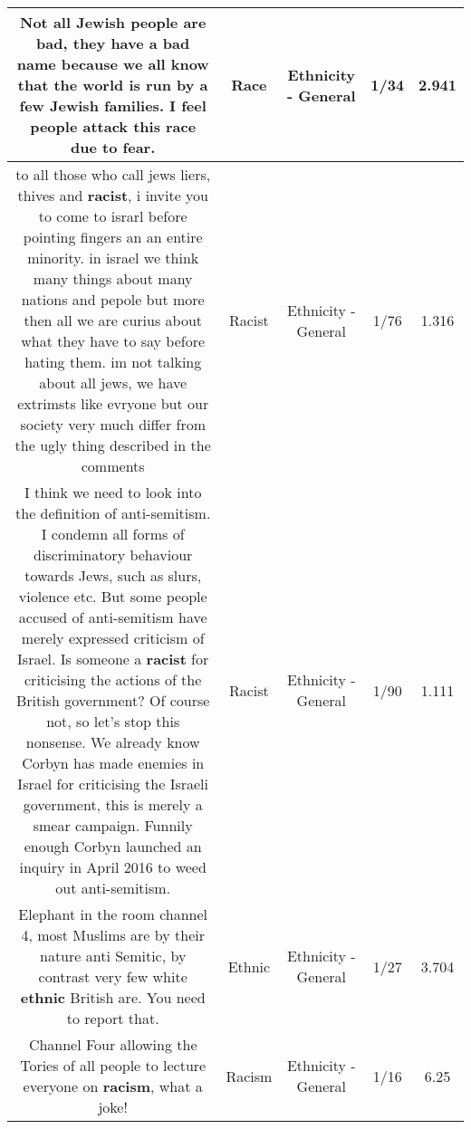 \documentclass[11pt]{article}
\newlength\mylength
\begin{document}
\begin{center}
\begin{longtable}{|C{.65\mylength}|C{.30\mylength}|C{.12\mylength}|C{.12\mylength}|C{.12\mylength}|}
  \small Not all Jewish people are bad, they have a bad name because we all know that the world is run by a few Jewish families. I feel people attack this \textbf{race} due to fear.\normalsize   & Race & Ethnicity - General & 1/34 & 2.941 \\  \hline
  \small to all those who call jews liers, thives and \textbf{racist}, i invite you to come to israrl before pointing fingers an an entire minority. in israel we think many things about many nations and pepole but more then all we are curius about what they have to say before hating them. im not talking about all jews, we have extrimsts like evryone but our society very much differ from the ugly thing described in the comments\normalsize   & Racist & Ethnicity - General & 1/76 & 1.316 \\  \hline
  \small I think we need to look into the definition of anti-semitism. I condemn all forms of discriminatory behaviour towards Jews, such as slurs, violence etc. But some people accused of anti-semitism have merely expressed criticism of Israel. Is someone a \textbf{racist} for criticising the actions of the British government? Of course not, so let's stop this nonsense. We already know Corbyn has made enemies in Israel for criticising the Israeli government, this is merely a smear campaign. Funnily enough Corbyn launched an inquiry in April 2016 to weed out anti-semitism.\normalsize   & Racist & Ethnicity - General & 1/90 & 1.111 \\  \hline
  \small Elephant in the room channel 4, most Muslims are by their nature anti Semitic, by contrast very few white \textbf{ethnic} British are. You need to report that.\normalsize   & Ethnic & Ethnicity - General & 1/27 & 3.704 \\  \hline
  \small Channel Four allowing the Tories of all people to lecture everyone on \textbf{racism}, what a joke!\normalsize   & Racism & Ethnicity - General & 1/16 & 6.25 \\  \hline

\end{longtable}
\end{center}
\end{document}
